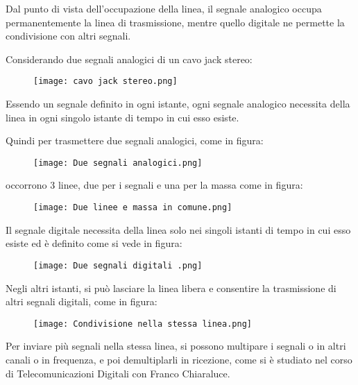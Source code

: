 Dal punto di vista dell'occupazione della linea, il segnale analogico occupa permanentemente la linea di trasmissione, 
mentre quello digitale ne permette la condivisione con altri segnali. \newline 

Considerando due segnali analogici di un cavo jack stereo: 

\begin{figure}[h]
    \centering
    \texttt{[image: cavo jack stereo.png]}
\end{figure}

Essendo un segnale definito in ogni istante, 
ogni segnale analogico necessita della linea in ogni singolo istante di tempo in cui esso esiste.\newline 

Quindi per trasmettere due segnali analogici, come in figura: 

\begin{figure}[h]
    \centering
    \texttt{[image: Due segnali analogici.png]}
\end{figure}

occorrono 3 linee, due per i segnali e una per la massa come in figura: 

\begin{figure}[h]
    \centering
    \texttt{[image: Due linee e massa in comune.png]}
\end{figure}

Il segnale digitale necessita della linea solo nei singoli istanti di tempo in cui esso esiste ed è definito come si vede in figura: 

\begin{figure}[h]
    \centering
    \texttt{[image: Due segnali digitali .png]}
\end{figure}

\newpage 

Negli altri istanti, si può lasciare la linea libera e consentire la trasmissione di altri segnali digitali, come in figura: 

\begin{figure}[h]
    \centering
    \texttt{[image: Condivisione nella stessa linea.png]}
\end{figure}


Per inviare più segnali nella stessa linea, 
si possono multipare i segnali o in altri canali o in frequenza, 
e poi demultiplarli in ricezione, come si è studiato nel corso di Telecomunicazioni Digitali con Franco Chiaraluce. \newline 


